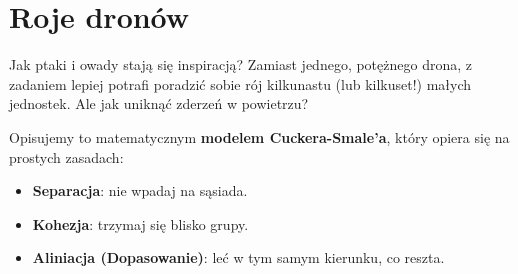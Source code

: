 \section{Roje dronów}

\begin{frame}{Jak ptaki i owady stają się inspiracją?}
    Zamiast jednego, potężnego drona, z zadaniem lepiej potrafi poradzić sobie rój kilkunastu (lub kilkuset!) małych jednostek. Ale jak uniknąć zderzeń w powietrzu? 
    \vspace{0.3cm}
    
    Opisujemy to matematycznym \textbf{modelem Cuckera-Smale'a}, który opiera się na prostych zasadach:
    \begin{itemize}
        \item \textbf{Separacja}: nie wpadaj na sąsiada.
        \item \textbf{Kohezja}: trzymaj się blisko grupy.
        \item \textbf{Aliniacja (Dopasowanie)}: leć w tym samym kierunku, co reszta.
    \end{itemize}
\end{frame}

